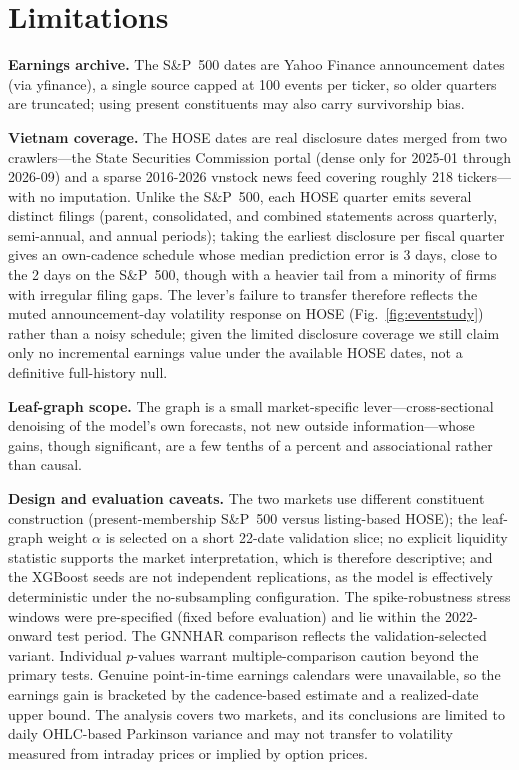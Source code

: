 \documentclass[runningheads,a4paper]{llncs}
\begin{document}
\FloatBarrier
\section{Limitations}
\noindent\textbf{Earnings archive.} The S\&P~500 dates are Yahoo Finance announcement dates (via
yfinance), a single source capped at 100 events per ticker, so older quarters are truncated; using present
constituents may also carry survivorship bias.

\noindent\textbf{Vietnam coverage.} The HOSE dates are real disclosure dates merged from two crawlers---the
State Securities Commission portal (dense only for 2025-01 through 2026-09) and a sparse 2016-2026 vnstock
news feed covering roughly 218 tickers---with no imputation. Unlike the S\&P~500, each HOSE quarter emits
several distinct filings (parent, consolidated, and combined statements across quarterly, semi-annual, and
annual periods); taking the earliest disclosure per fiscal quarter gives an own-cadence schedule whose
median prediction error is 3 days, close to the 2 days on the S\&P~500, though with a heavier tail from a
minority of firms with irregular filing gaps. The lever's failure to transfer therefore reflects the muted
announcement-day volatility response on HOSE (Fig.~\ref{fig:eventstudy}) rather than a noisy schedule;
given the limited disclosure coverage we still claim only no incremental earnings value under the available
HOSE dates, not a definitive full-history null.

\noindent\textbf{Leaf-graph scope.} The graph is a small market-specific lever---cross-sectional denoising
of the model's own forecasts, not new outside information---whose gains, though significant, are a few
tenths of a percent and associational rather than causal.

\noindent\textbf{Design and evaluation caveats.} The two markets use different constituent construction
(present-membership S\&P~500 versus listing-based HOSE); the leaf-graph weight $\alpha$ is selected on a short 22-date validation slice; no explicit
liquidity statistic supports the market interpretation, which is therefore descriptive; and the XGBoost
seeds are not independent replications, as the model is effectively deterministic under the no-subsampling
configuration. The spike-robustness stress windows were pre-specified (fixed before evaluation) and lie
within the 2022-onward test period. The GNNHAR comparison reflects the validation-selected variant.
Individual $p$-values warrant multiple-comparison caution beyond the primary tests. Genuine point-in-time
earnings calendars were unavailable, so the earnings gain is bracketed by the cadence-based estimate and a
realized-date upper bound. The analysis covers two markets, and its conclusions are limited to daily
OHLC-based Parkinson variance and may not transfer to volatility measured from intraday prices or implied by option prices.
\end{document}
